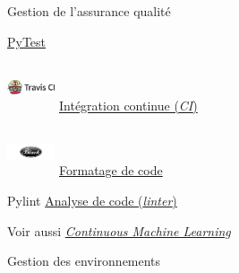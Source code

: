 \documentclass[aspectratio=169,10pt,xcolor=x11names,english,french]{beamer}
\begin{document}
	\begin{frame}{Gestion de l'assurance qualité}
		\begin{minipage}{0.24\linewidth}
			\centering
			 \vfil
			\vspace{1em}
			\href{https://docs.pytest.org/en/7.1.x/}{PyTest}
		\end{minipage}
		\begin{minipage}{0.24\linewidth}
			\centering
			\includegraphics[width=40pt, height=40pt, keepaspectratio]{./img/TravisCI-Full-Color} \vfil
			\vspace{1em}
			\href{https://travis-ci.org/}{Intégration continue (\textit{CI})}
		\end{minipage}
		\begin{minipage}{0.24\linewidth}
			\centering
			\includegraphics[width=40pt, height=40pt, keepaspectratio]{./img/black-python} \vfil
			\vspace{1em}
			\href{https://black.readthedocs.io/en/stable/}{Formatage de code}
		\end{minipage}
		\begin{minipage}{0.24\linewidth}
			\centering
			Pylint \vfil
			\vspace{1em}
			\href{https://pylint.pycqa.org/en/latest/index.html}{Analyse de code (\textit{linter})}
		\end{minipage}
	\hfill
	\vspace{2em}
	
	\bigskip
		Voir aussi \textit{\href{https://martinfowler.com/articles/cd4ml.html}{Continuous Machine Learning}}
		\note{}
	\end{frame}
	
	\begin{frame}{Gestion des environnements}
		
		\centering
		
	\end{frame}
\end{document}
